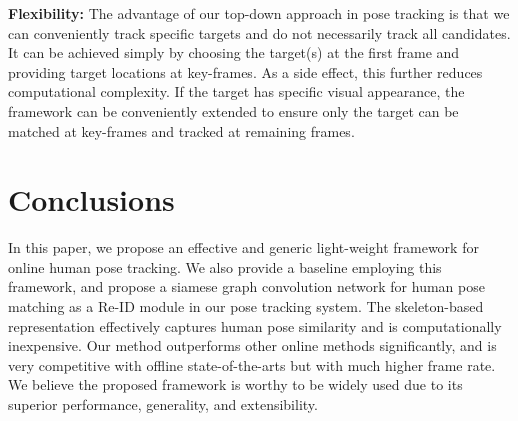 \documentclass[10pt,twocolumn,letterpaper]{article}
\begin{document}
	
	\noindent\textbf{Flexibility:} 
	The advantage of our top-down approach in pose tracking is that we can conveniently track specific targets and do not necessarily track all candidates. It can be achieved simply by choosing the target(s) at the first frame and providing target locations at key-frames. As a side effect, this further reduces computational complexity. If the target has specific visual appearance, the framework can be conveniently extended to ensure only the target can be matched at key-frames and tracked at remaining frames.
	
	
\section{Conclusions}
	In this paper, we propose an effective and generic light-weight framework for online human pose tracking.
	We also provide a baseline employing this framework, and propose a siamese graph convolution network for human pose matching as a Re-ID module in our pose tracking system. 
	The skeleton-based representation effectively captures human pose similarity and is computationally inexpensive. 
	Our method outperforms other online methods significantly, and is very competitive with offline state-of-the-arts but with much higher frame rate.
	We believe the proposed framework is worthy to be widely used due to its superior performance, generality, and extensibility. 


	
{\small
		
		
	}
	
	
\end{document}
